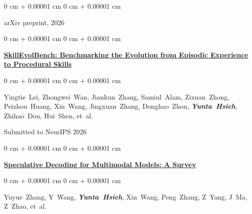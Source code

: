 \documentclass[10pt, letterpaper]{article}
\newenvironment{onecolentry}{
    \begin{adjustwidth}{
        0 cm + 0.00001 cm
    }{
        0 cm + 0.00001 cm
    }
}{
    \end{adjustwidth}
} %
\begin{document}
\begin{samepage}
\begin{onecolentry}
                \vspace{0.05 cm}
                arXiv preprint, 2026
            \end{onecolentry}
            
            \vspace{0.10 cm}
            
            \begin{onecolentry}
                {\uline{\textbf{SkillEvolBench: Benchmarking the Evolution from Episodic Experience to Procedural Skills}}}
            \end{onecolentry}
            
            \vspace{0.10 cm}
            
            \begin{onecolentry}
                \mbox{Yingtie Lei}, 
                \mbox{Zhongwei Wan}, 
                \mbox{Jiankun Zhang}, 
                \mbox{Samiul Alam}, 
                \mbox{Zixuan Zhong}, 
                \mbox{Peizhou Huang}, 
                \mbox{Xin Wang}, 
                \mbox{Jingxuan Zhang}, 
                \mbox{Donghao Zhou}, 
                \textbf{\textit{\mbox{Yunta Hsieh}}}, 
                \mbox{Zhihao Dou}, 
                \mbox{Hui Shen}, 
                \mbox{et al.}
                
                \vspace{0.05 cm}
                Submitted to NeurIPS 2026
            \end{onecolentry}
            
            \vspace{0.10 cm}
            
            \begin{onecolentry}
                \href{https://www.preprints.org/manuscript/202603.2344}
                {\uline{\textbf{Speculative Decoding for Multimodal Models: A Survey}}}
            \end{onecolentry}
            
            \vspace{0.10 cm}
            
            \begin{onecolentry}
                \mbox{Yuyue Zhang}, 
                \mbox{Y Wang}, 
                \textbf{\textit{\mbox{Yunta Hsieh}}}, 
                \mbox{Xin Wang}, 
                \mbox{Peng Zhang}, 
                \mbox{Z Yang}, 
                \mbox{J Ma}, 
                \mbox{Z Zhao}, 
                \mbox{et al.}
                

\end{onecolentry}
\end{samepage}
\end{document}
